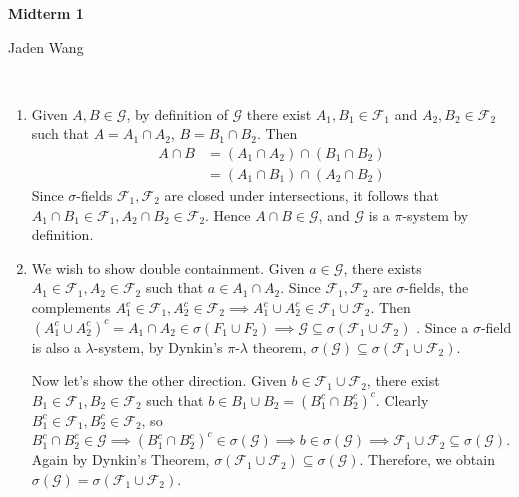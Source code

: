 \documentclass[12pt]{article}
\begin{document}
\centerline {\textsf{\textbf{\LARGE{Midterm 1 }}}}
\centerline {Jaden Wang}
\vspace{.15in}
\begin{problem}[1]
~\begin{enumerate}[label=\alph*)]
	\item Given $ A,B \in \mathcal{G}$, by definition of $ \mathcal{G}$ there exist $ A_1, B_1 \in \mathcal{F}_1$ and $ A_2, B_2 \in \mathcal{F}_2$ such that $ A=A_1 \cap A_2$, $ B= B_1 \cap B_2$. Then
\begin{align*}
	A \cap B &= (A_1 \cap A_2) \cap (B_1 \cap B_2) \\
		 &= (A_1 \cap B_1) \cap (A_2 \cap B_2)
\end{align*}
Since $\sigma$-fields $ \mathcal{F}_1, \mathcal{F}_2$ are closed under intersections, it follows that $ A_1 \cap B_1 \in \mathcal{F}_1, A_2 \cap B_2 \in \mathcal{F}_2$. Hence $ A \cap B \in \mathcal{G}$, and $ \mathcal{G}$ is a $ \pi$-system by definition.
\item We wish to show double containment. Given $ a \in \mathcal{G}$, there exists $ A_1 \in \mathcal{F}_1, A_2 \in \mathcal{F}_2$ such that $ a \in A_1 \cap A_2$. Since $ \mathcal{F}_1,\mathcal{F}_2$ are $\sigma$-fields, the complements $ A_1^{c} \in \mathcal{F}_1, A_2^{c} \in \mathcal{F}_2 \implies A_1^{c} \cup A_2^{c} \in \mathcal{F}_1 \cup \mathcal{F}_2$. Then  $ (A_1^{c} \cup A_2^{c})^{c} = A_1 \cap A_2 \in \sigma(F_1 \cup F_2) \implies \mathcal{G} \subseteq \sigma(\mathcal{F}_1 \cup \mathcal{F}_2)$ . Since a $\sigma$-field is also a $\lambda$-system, by Dynkin's $ \pi$-$ \lambda$ theorem, $ \sigma(\mathcal{G}) \subseteq \sigma(\mathcal{F}_1 \cup  \mathcal{F}_2)$.

	Now let's show the other direction. Given $ b \in \mathcal{F}_1 \cup \mathcal{F}_2$, there exist $ B_1 \in \mathcal{F}_1, B_2 \in \mathcal{F}_2$ such that $ b \in B_1 \cup B_2 = (B_1^{c} \cap B_2^{c})^{c}$. Clearly $ B_1^{c} \in \mathcal{F}_1, B_2^{c} \in \mathcal{F}_2$, so $ B_1^{c} \cap B_2^{c} \in \mathcal{G} \implies (B_1^{c} \cap B_2^{c})^{c} \in \sigma(\mathcal{G}) \implies b \in \sigma(\mathcal{G}) \implies \mathcal{F}_1 \cup \mathcal{F}_2 \subseteq \sigma(\mathcal{G})$. Again by Dynkin's Theorem, $ \sigma(\mathcal{F}_1 \cup \mathcal{F}_2) \subseteq \sigma(\mathcal{G})$. Therefore, we obtain $ \sigma(\mathcal{G})= \sigma(\mathcal{F}_1 \cup  \mathcal{F}_2)$. 
\end{enumerate}
\end{problem}
\end{document}
